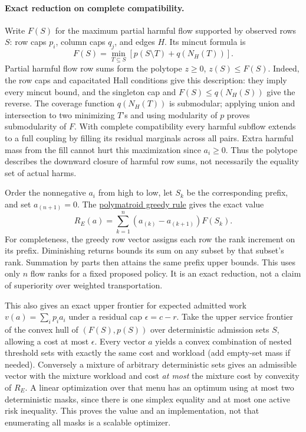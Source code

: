 \documentclass{article}
\begin{document}
\paragraph{Exact reduction on complete compatibility.}
Write \(F(S)\) for the maximum partial harmful flow supported by
observed rows \(S\): row caps \(p_i\), column caps \(q_j\), and
edges \(H\). Its mincut formula is
\[
 F(S)=\min_{T\subseteq S}\left[p(S\setminus T)+q(N_H(T))\right].
\]
Partial harmful flow row sums form the polytope \(z\ge0\),
\(z(S)\le F(S)\). Indeed, the row caps and capacitated Hall
conditions give this description: they imply every mincut bound,
and the singleton cap and \(F(S)\le q(N_H(S))\) give the reverse.
The coverage function \(q(N_H(T))\) is submodular; applying union
and intersection to two minimizing \(T\)'s and using modularity of
\(p\) proves submodularity of \(F\). With complete compatibility
every harmful subflow extends to a full coupling by filling its
residual marginals across all pairs. Extra harmful mass from the
fill cannot hurt this maximization since \(a_i\ge0\). Thus the
polytope describes the downward closure of harmful row sums, not
necessarily the equality set of actual harms.

Order the nonnegative \(a_i\) from high to low, let \(S_k\) be
the corresponding prefix, and set \(a_{(n+1)}=0\). The
\href{https://deltadbu.github.io/UCAS_algorithm_course/Lectures/Edmonds1971.pdf}{polymatroid greedy rule}
gives the exact value
\[
 R_E(a)=\sum_{k=1}^n(a_{(k)}-a_{(k+1)})F(S_k).
\]
For completeness, the greedy row vector assigns each row the rank
increment on its prefix. Diminishing returns bounds its sum on
any subset by that subset's rank. Summation by parts then
attains the same prefix upper bounds. This uses only \(n\) flow
ranks for a fixed proposed policy. It is an exact reduction,
not a claim of superiority over weighted transportation.

This also gives an exact upper frontier for expected admitted
work \(v(a)=\sum_i p_i a_i\) under a residual cap \(\epsilon=c-r\).
Take the upper service frontier of the convex hull of
\((F(S),p(S))\) over deterministic admission sets \(S\), allowing a
cost at most \(\epsilon\). Every vector \(a\) yields a convex
combination of nested threshold sets with exactly the same cost
and workload (add empty-set mass if needed). Conversely a mixture
of arbitrary deterministic sets gives an admissible vector with
the mixture workload and cost \emph{at most} the mixture cost
by convexity of \(R_E\). A linear optimization over that menu
has an optimum using at most two deterministic masks, since
there is one simplex equality and at most one active risk
inequality. This proves the value and an implementation, not
that enumerating all masks is a scalable optimizer.
\end{document}
